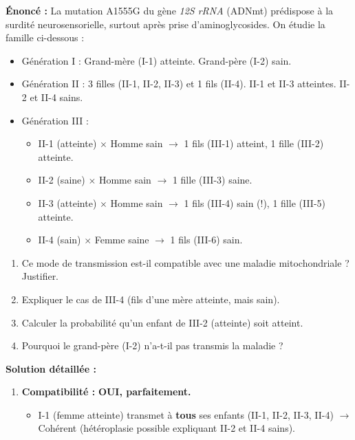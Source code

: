 \documentclass[11pt]{article}
\begin{document}
\begin{exoresolu}
    \textbf{Énoncé :} La mutation A1555G du gène \emph{12S rRNA} (ADNmt) prédispose à la surdité neurosensorielle, surtout après prise d'aminoglycosides. On étudie la famille ci-dessous :
    \begin{itemize}
        \item Génération I : Grand-mère (I-1) atteinte. Grand-père (I-2) sain.
        \item Génération II : 3 filles (II-1, II-2, II-3) et 1 fils (II-4). II-1 et II-3 atteintes. II-2 et II-4 sains.
        \item Génération III :
              \begin{itemize}
                  \item II-1 (atteinte) $\times$ Homme sain $\to$ 1 fils (III-1) atteint, 1 fille (III-2) atteinte.
                  \item II-2 (saine) $\times$ Homme sain $\to$ 1 fille (III-3) saine.
                  \item II-3 (atteinte) $\times$ Homme sain $\to$ 1 fils (III-4) sain (!), 1 fille (III-5) atteinte.
                  \item II-4 (sain) $\times$ Femme saine $\to$ 1 fils (III-6) sain.
              \end{itemize}
    \end{itemize}
    \begin{enumerate}
        \item Ce mode de transmission est-il compatible avec une maladie mitochondriale ? Justifier.
        \item Expliquer le cas de III-4 (fils d'une mère atteinte, mais sain).
        \item Calculer la probabilité qu'un enfant de III-2 (atteinte) soit atteint.
        \item Pourquoi le grand-père (I-2) n'a-t-il pas transmis la maladie ?
    \end{enumerate}
    \tcblower
    \textbf{Solution détaillée :}
    \begin{enumerate}
        \item \textbf{Compatibilité :} \textbf{OUI, parfaitement.}
              \begin{itemize}
                  \item I-1 (femme atteinte) transmet à \textbf{tous} ses enfants (II-1, II-2, II-3, II-4) $\to$ Cohérent (hétéroplasie possible expliquant II-2 et II-4 sains).

\end{itemize}
\end{enumerate}
\end{exoresolu}
\end{document}
